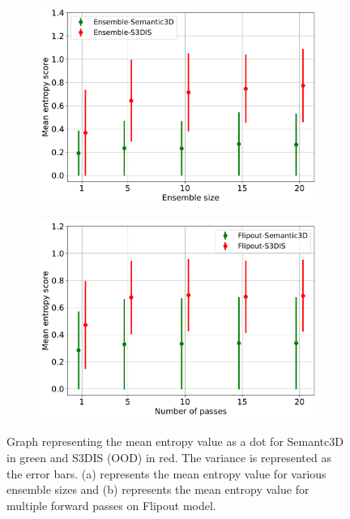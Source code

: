     \begin{figure}[!ht]
        \begin{subfigure}{0.98\textwidth}
            \centering
        \includegraphics[scale=0.5]{images/MSP/Ensembles_ENT_semvs3d.pdf}
        \caption{}
        \label{fig:ent_ensembles}
        \end{subfigure}
        \begin{subfigure}{0.98\textwidth}
            \centering
        \includegraphics[scale=0.5]{images/MSP/Flipout_ENT_semvs3d.pdf}
        \caption{}
        \label{fig:ent_flipout}
        \end{subfigure}
        \caption{Graph representing the mean entropy value as a dot for Semantc3D in green and S3DIS (OOD) in red. The variance is represented as the error bars.  (a) represents the mean entropy value for various ensemble sizes and (b) represents the mean entropy value for multiple forward passes on Flipout model.}
    \end{figure}
